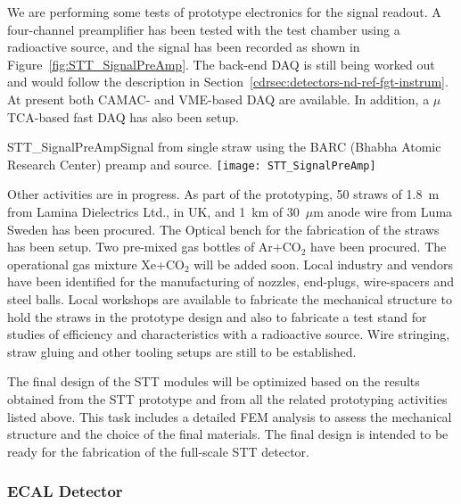 We are performing some tests of prototype electronics for the signal readout. 
A four-channel preamplifier has been
tested with the test chamber using a radioactive source, and the signal
has been recorded as shown in Figure~\ref{fig:STT_SignalPreAmp}.  The
back-end DAQ is still being worked out and would follow the description 
in Section~\ref{cdrsec:detectors-nd-ref-fgt-instrum}. At
present both CAMAC- and VME-based DAQ are available. In addition, a $\mu$TCA-based fast
DAQ has also been setup. 
\begin{cdrfigure}
{STT_SignalPreAmp}{Signal from single straw using the BARC (Bhabha Atomic Research Center) preamp and source.}
\texttt{[image: STT\_SignalPreAmp]}
\end{cdrfigure}

Other activities are in progress. As part of the prototyping, 50 straws of 1.8~m from Lamina
Dielectrics Ltd., in UK, and 1~km of 30~$\mu$m anode wire from Luma
Sweden has been procured. The Optical bench for the fabrication of the
straws has been setup.  Two pre-mixed gas bottles of Ar+CO$_2$ have been
procured. The operational gas mixture %
Xe+CO$_2$ will be added
soon. Local industry and vendors have been identified for the
manufacturing of nozzles, end-plugs, wire-spacers and steel
balls. Local workshops are available to fabricate the mechanical
structure to hold the straws in the prototype design and also to
fabricate a test stand for studies of efficiency and characteristics with
a radioactive source. Wire stringing, straw gluing and other tooling
setups are still to be established.


The final design of the STT modules will be optimized based on the
results obtained from the STT prototype and from all the related prototyping
activities listed above. This task includes a detailed FEM analysis to
assess the mechanical structure and the choice of the final
materials. The final design is intended to be ready for the
fabrication of the full-scale STT detector. 



\subsubsection{ECAL Detector}

